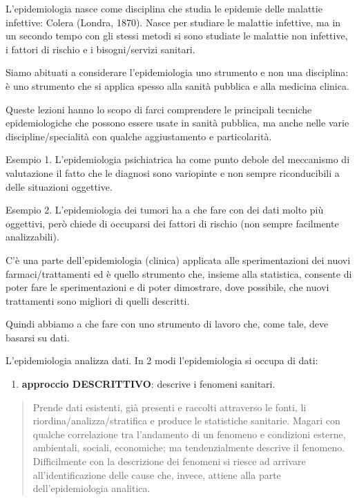 L'epidemiologia nasce come disciplina che studia le epidemie delle
malattie infettive: Colera (Londra, 1870). Nasce per studiare le
malattie infettive, ma in un secondo tempo con gli stessi metodi si sono
studiate le malattie non infettive, i fattori di rischio e i
bisogni/servizi sanitari.

Siamo abituati a considerare l'epidemiologia uno strumento e non una
disciplina: è uno strumento che si applica spesso alla sanità pubblica e
alla medicina clinica.

Queste lezioni hanno lo scopo di farci comprendere le principali
tecniche epidemiologiche che possono essere usate in sanità pubblica, ma
anche nelle varie discipline/specialità con qualche aggiustamento e
particolarità.

Esempio 1. L'epidemiologia psichiatrica ha come punto debole del
meccanismo di valutazione il fatto che le diagnosi sono variopinte e non
sempre riconducibili a delle situazioni oggettive.

Esempio 2. L'epidemiologia dei tumori ha a che fare con dei dati molto
più oggettivi, però chiede di occuparsi dei fattori di rischio (non
sempre facilmente analizzabili).

C'è una parte dell'epidemiologia (clinica) applicata alle
sperimentazioni dei nuovi farmaci/trattamenti ed è quello strumento che,
insieme alla statistica, consente di poter fare le sperimentazioni e di
poter dimostrare, dove possibile, che nuovi trattamenti sono migliori di
quelli descritti.

Quindi abbiamo a che fare con uno strumento di lavoro che, come tale,
deve basarsi su dati.

L'epidemiologia analizza dati. In 2 modi l'epidemiologia si occupa di
dati:

\begin{enumerate}
\def\labelenumi{\arabic{enumi}.}
\item
  \textbf{approccio DESCRITTIVO}: descrive i fenomeni sanitari.
\end{enumerate}

\begin{quote}
Prende dati esistenti, già presenti e raccolti attraverso le fonti, li
riordina/analizza/stratifica e produce le statistiche sanitarie. Magari
con qualche correlazione tra l'andamento di un fenomeno e condizioni
esterne, ambientali, sociali, economiche; ma tendenzialmente descrive il
fenomeno. Difficilmente con la descrizione dei fenomeni si riesce ad
arrivare all'identificazione delle cause che, invece, attiene alla parte
dell'epidemiologia analitica.
\end{quote}

